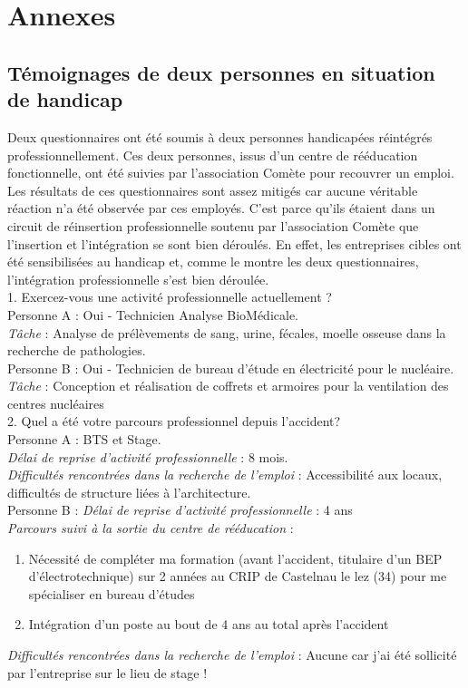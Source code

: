 \chapter{Annexes}

\section{Témoignages de deux personnes en situation de handicap}

Deux questionnaires ont été soumis à deux personnes handicapées réintégrés professionnellement. Ces deux personnes, issus d'un centre de rééducation fonctionnelle, ont été suivies par l'association Comète pour recouvrer un emploi.\\

Les résultats de ces questionnaires sont assez mitigés car aucune véritable réaction n'a été observée par ces employés. C'est parce qu'ils étaient dans un circuit de réinsertion professionnelle soutenu par l'association Comète que l'insertion et l'intégration se sont bien déroulés. En effet, les entreprises cibles ont été sensibilisées au handicap et, comme le montre les deux questionnaires, l'intégration professionnelle s'est bien déroulée. \\

1. Exercez-vous une activité professionnelle actuellement ?\\
Personne A : Oui - Technicien Analyse BioMédicale.\\
\textit{Tâche} : Analyse de prélèvements de sang, urine, fécales, moelle osseuse dans la recherche de pathologies.\\
Personne B : Oui - Technicien de bureau d'étude en électricité pour le nucléaire.\\ \textit{Tâche} : Conception et réalisation de coffrets et armoires pour la ventilation des centres nucléaires \\


2. Quel a été votre parcours professionnel depuis l’accident?\\
Personne A : BTS et Stage. \\
\textit{Délai de reprise d'activité professionnelle} : 8 mois.\\
\textit{Difficultés rencontrées dans la recherche de l'emploi} : Accessibilité aux locaux, difficultés de structure liées à l'architecture.\\
Personne B : \textit{Délai de reprise d'activité professionnelle} : 4 ans \\ 
\textit{Parcours suivi à la sortie du centre de rééducation} : 
\begin{enumerate}
\item Nécessité de compléter ma formation (avant l’accident, titulaire d’un BEP d’électrotechnique) sur 2 années au CRIP de Castelnau le lez (34) pour me spécialiser en bureau d’études
\item Intégration d’un poste au bout de 4 ans au total après l’accident\\
\end{enumerate}
\textit{Difficultés rencontrées dans la recherche de l'emploi} : Aucune car j'ai été sollicité par l'entreprise sur le lieu de stage ! \\


